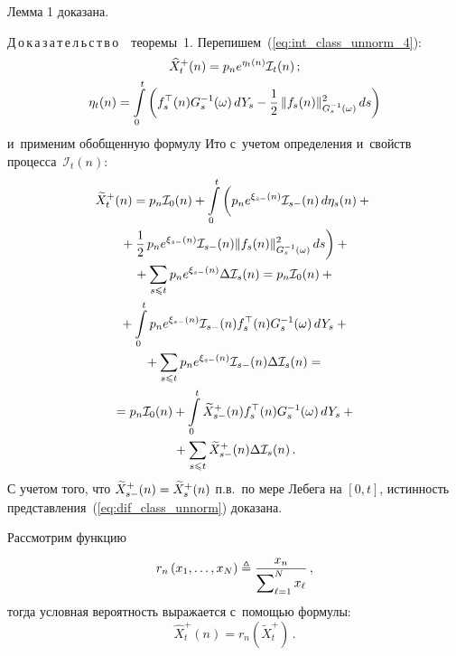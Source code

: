 \begin{multicols}{2}
{ Лемма 1 доказана.


\smallskip


\noindent
Д\,о\,к\,а\,з\,а\,т\,е\,л\,ь\,с\,т\,в\,о\ \ теоремы~1. 
 Перепишем~(\ref{eq:int_class_unnorm_4}):
 \begin{multline*}
 \widehat{X}^+_t(n)=p_n e^{\eta_t(n)} \mathcal{I}_t(n)\,; \\
 \eta_t(n) =   \int\limits_0^{t}    \left(
     f_s^{\top}(n)G_s^{-1}(\omega)\,dY_s -
\displaystyle\frac{\displaystyle 1\mathstrut}{\displaystyle 2\mathstrut}\,\|f_s(n)\|^2_{G_s^{-1}(\omega)}\,ds
        \right)
 \end{multline*}
 и~применим обобщенную формулу Ито с~учетом определения 
 и~свойств процесса~$\mathcal{I}_{t}(n)$:
 \begin{multline*}
 \widetilde{X}^+_t(n) = p_n \mathcal{I}_0(n) +
 \int\limits_0^t \left( \vphantom{\fr{1}{2}}
  p_n e^{\xi_{s-}(n)} \mathcal{I}_{s-}(n)\,d\eta_s(n) +{}\right.\\
\left. {}+
\fr{1}{2}\,p_n e^{\xi_{s-}(n)} \mathcal{I}_{s-}(n) 
\|f_s(n)\|^2_{G_s^{-1}(\omega)}\,ds
 \right) + {}\\ 
 {}+\sum\limits_{s \leqslant t} p_n e^{\xi_{s-}(n)} \Delta \mathcal{I}_{s}(n) =
 p_n \mathcal{I}_0(n) +{}\\
 {}+
 \int\limits_0^t p_n e^{\xi_{s-}(n)} 
 \mathcal{I}_{s-}(n)f_s^{\top}(n)G_s^{-1}(\omega)\,dY_s  +{}\\
 {}+
 \sum\limits_{s \leqslant t} p_n e^{\xi_{s-}(n)} \mathcal{I}_{s-}(n)\Delta 
 \mathcal{I}_{s}(n) ={} \\
{} =
 p_n \mathcal{I}_0(n) +
 \int\limits_0^t \widetilde{X}^+_{s-}(n)f_s^{\top}(n)G_s^{-1}(\omega)\,dY_s  +{}\\
 {}+
 \sum\limits_{s \leqslant t} \widetilde{X}^+_{s-}(n)\Delta \mathcal{I}_{s}(n)\,.
 \end{multline*}
 С учетом того, что $\widetilde{X}_{s-}^+(n) \hm= \widetilde{X}_{s}^+(n)$ 
 п.в.\ по мере Лебега на $[0,t]$, истинность 
 представления~(\ref{eq:dif_class_unnorm}) доказана.

 Рассмотрим функцию 
 $$
  r_n\left(x_1,\ldots,x_N\right) \triangleq 
 \displaystyle\frac{\displaystyle x_n\mathstrut}{\displaystyle \sum\nolimits_{\ell=1}^N x_{\ell}\mathstrut}\,,
 $$
  тогда условная вероятность выражается 
 с~по\-мощью формулы: 
 $$
 \widehat{X}^+_t (n) = r_n\left(\widetilde{X}^+_t\right)\,.
 $$
 
}
\end{multicols}

